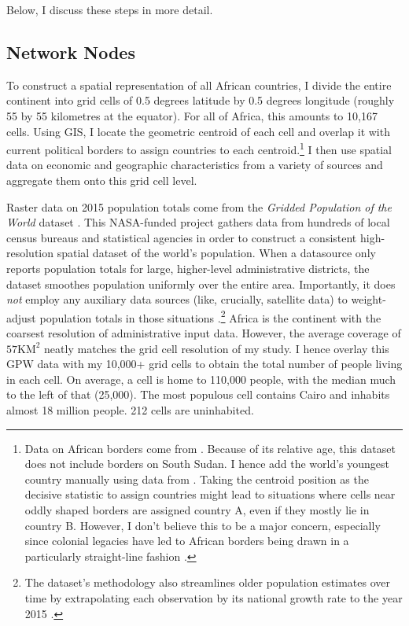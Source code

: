 \documentclass[11pt, oneside]{article}   	%
\begin{document}
Below, I discuss these steps in more detail.

\subsection{Network Nodes}

To construct a spatial representation of all African countries, I divide the entire continent into grid cells of 0.5 degrees latitude by 0.5 degrees longitude (roughly 55 by 55 kilometres at the equator). For all of Africa, this amounts to 10,167 cells. Using GIS, I locate the geometric centroid of each cell and overlap it with current political borders to assign countries to each centroid.\footnote{Data on African borders come from \cite{Sandvik_WorldBordersDataset_2008}. Because of its relative age, this dataset does not include borders on South Sudan. I hence add the world's youngest country manually using data from \cite{OCHA_SouthSudanAdministrative_2017}. Taking the centroid position as the decisive statistic to assign countries might lead to situations where cells near oddly shaped borders are assigned country A, even if they mostly lie in country B. However, I don't believe this to be a major concern, especially since colonial legacies have led to African borders being drawn in a particularly straight-line fashion \citep[see][]{Alesina_ArtificialStates_2011}.} I then use spatial data on economic and geographic characteristics from a variety of sources and aggregate them onto this grid cell level.

Raster data on 2015 population totals come from the \textit{Gridded Population of the World} dataset \citep[GPW,][]{socioeconomic_data_and_applications_center_gridded_2016}. This NASA-funded project gathers data from hundreds of local census bureaus and statistical agencies in order to construct a consistent high-resolution spatial dataset of the world's population. When a datasource only reports population totals for large, higher-level administrative districts, the dataset smoothes population uniformly over the entire area. Importantly, it does \emph{not} employ any auxiliary data sources (like, crucially, satellite data) to weight-adjust population totals in those situations \citep{Doxsey-Whitfield_TakingAdvantageImproved_2015}.\footnote{The dataset's methodology also streamlines older population estimates over time by extrapolating each observation by its national growth rate to the year 2015 \citep{Doxsey-Whitfield_TakingAdvantageImproved_2015}.} Africa is the continent with the coarsest resolution of administrative input data. However, the average coverage of $57\textrm{KM}^{2}$ neatly matches the grid cell resolution of my study. I hence overlay this GPW data with my 10,000+ grid cells to obtain the total number of people living in each cell. On average, a cell is home to 110,000 people, with the median much to the left of that (25,000). The most populous cell contains Cairo and inhabits almost 18 million people. 212 cells are uninhabited.
\end{document}
